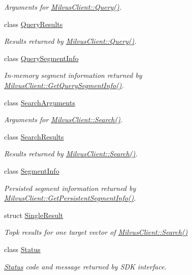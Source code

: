 \begin{DoxyCompactItemize}
\begin{DoxyCompactList}\small\item\em Arguments for \hyperlink{classmilvus_1_1_milvus_client_a2c27e3b681313329ccf491867d717182}{Milvus\+Client\+::\+Query()}. \end{DoxyCompactList}\item 
class \hyperlink{classmilvus_1_1_query_results}{Query\+Results}
\begin{DoxyCompactList}\small\item\em Results returned by \hyperlink{classmilvus_1_1_milvus_client_a2c27e3b681313329ccf491867d717182}{Milvus\+Client\+::\+Query()}. \end{DoxyCompactList}\item 
class \hyperlink{classmilvus_1_1_query_segment_info}{Query\+Segment\+Info}
\begin{DoxyCompactList}\small\item\em In-\/memory segment information returned by \hyperlink{classmilvus_1_1_milvus_client_a7a5a78cb57e5d80adea1f1b0bffe5ba0}{Milvus\+Client\+::\+Get\+Query\+Segment\+Info()}. \end{DoxyCompactList}\item 
class \hyperlink{classmilvus_1_1_search_arguments}{Search\+Arguments}
\begin{DoxyCompactList}\small\item\em Arguments for \hyperlink{classmilvus_1_1_milvus_client_a46c70fc2b7c386003babd90e02b299d1}{Milvus\+Client\+::\+Search()}. \end{DoxyCompactList}\item 
class \hyperlink{classmilvus_1_1_search_results}{Search\+Results}
\begin{DoxyCompactList}\small\item\em Results returned by \hyperlink{classmilvus_1_1_milvus_client_a46c70fc2b7c386003babd90e02b299d1}{Milvus\+Client\+::\+Search()}. \end{DoxyCompactList}\item 
class \hyperlink{classmilvus_1_1_segment_info}{Segment\+Info}
\begin{DoxyCompactList}\small\item\em Persisted segment information returned by \hyperlink{classmilvus_1_1_milvus_client_a383e2ef16d4add6af450170775869604}{Milvus\+Client\+::\+Get\+Persistent\+Segment\+Info()}. \end{DoxyCompactList}\item 
struct \hyperlink{structmilvus_1_1_single_result}{Single\+Result}
\begin{DoxyCompactList}\small\item\em Topk results for one target vector of \hyperlink{classmilvus_1_1_milvus_client_a46c70fc2b7c386003babd90e02b299d1}{Milvus\+Client\+::\+Search()} \end{DoxyCompactList}\item 
class \hyperlink{classmilvus_1_1_status}{Status}
\begin{DoxyCompactList}\small\item\em \hyperlink{classmilvus_1_1_status}{Status} code and message returned by S\+DK interface. \end{DoxyCompactList}\end{DoxyCompactItemize}
